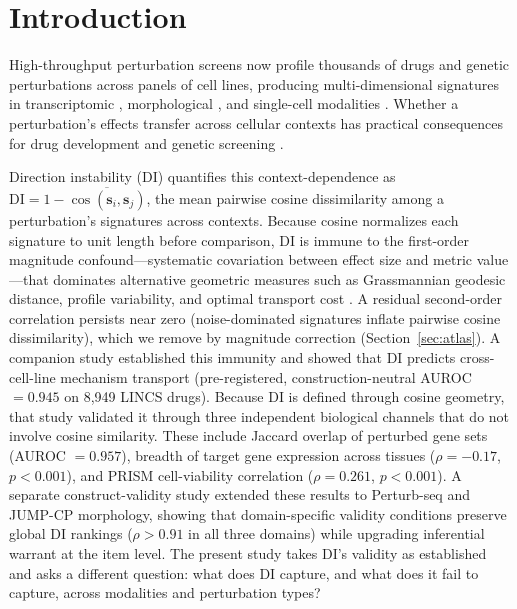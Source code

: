\documentclass[11pt]{article}
\begin{document}
\section{Introduction}

High-throughput perturbation screens now profile thousands of drugs and
genetic perturbations across panels of cell lines, producing
multi-dimensional signatures in transcriptomic
\citep{lamb2006connectivity, subramanian2017next}, morphological
\citep{bray2016cell}, and single-cell modalities \citep{tahoe2025}.
Whether a perturbation's effects transfer across cellular contexts has
practical consequences for drug development and genetic screening
\citep{mcfarland2020context, tower2026confound}.

Direction instability (DI) quantifies this context-dependence as
$\mathrm{DI} = 1 - \overline{\cos(\mathbf{s}_i, \mathbf{s}_j)}$, the
mean pairwise cosine dissimilarity among a perturbation's signatures
across contexts.  Because cosine normalizes each signature to unit
length before comparison, DI is immune to the first-order magnitude
confound---systematic covariation between effect size and metric
value---that dominates alternative geometric measures such as
Grassmannian geodesic distance, profile variability, and optimal
transport cost \citep{tower2026confound}.  A residual second-order
correlation persists near zero (noise-dominated signatures inflate
pairwise cosine dissimilarity), which we remove by magnitude correction
(Section~\ref{sec:atlas}).  A companion study \citep{tower2026confound}
established this immunity and showed that DI predicts
cross-cell-line mechanism transport (pre-registered,
construction-neutral AUROC $= 0.945$ on 8{,}949 LINCS drugs).  Because DI is defined through cosine
geometry, that study validated it through three independent biological
channels that do not involve cosine similarity.  These include Jaccard
overlap of perturbed gene sets (AUROC $= 0.957$), breadth of target gene
expression across tissues ($\rho = -0.17$, $p < 0.001$), and PRISM
cell-viability correlation ($\rho = 0.261$, $p < 0.001$).  A separate
construct-validity study \citep{tower2026validity} extended these results
to Perturb-seq and JUMP-CP morphology, showing that domain-specific
validity conditions preserve global DI rankings ($\rho > 0.91$ in all
three domains) while upgrading inferential warrant at the item level.
The present study takes DI's validity as established and asks a
different question: what does DI capture, and what does it fail to
capture, across modalities and perturbation types?
\end{document}
